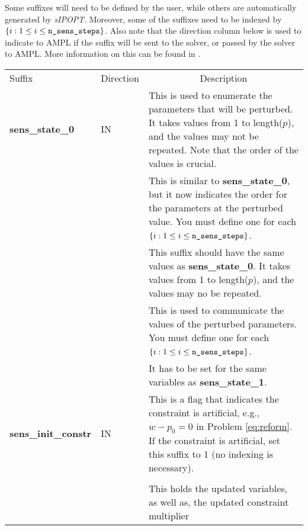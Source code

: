 \documentclass[letter, 11pt]{article}
\newcommand{\sensKKT}{\emph{sIPOPT}}
\newcommand{\AMPL}{AMPL}
\newcommand{\curls}[1]{\ensuremath{\left\{ #1 \right\}}}
\newcommand{\statez}{sens\_state\_0}
\newcommand{\stateo}{sens\_state\_1}
\newcommand{\initc}{sens\_init\_constr}
\newcommand{\statei}[1]{sens\_state\_#1}
\newcommand{\statevi}[1]{sens\_state\_value\_#1}
\newcommand{\sstatei}[1]{sens\_sol\_state\_#1}
\newcommand{\nstepsopt}{n\_sens\_steps}
\begin{document}
Some suffixes will need to be defined by the user, while others are automatically generated by {\sensKKT}. Moreover,
some of the suffixes need to be indexed by  $\curls{i: 1 \leq i \leq \mbox{\texttt{\nstepsopt}}}$. Also note that the
direction column below is used to indicate to {\AMPL} if the suffix will be sent to the solver, or passed by the solver to {\AMPL}.
More information on this can be found in \cite{ampl}.\\

\begin{tabular}{|>{\centering}m{3.5cm}|>{\centering}m{2cm}|m{}|}\hline
\multicolumn{3}{|c|}{\textbf{Defined by User}} \\ \hline
Suffix & Direction & \multicolumn{1}{c|}{Description}  \\ \hline
\textbf{\statez} & IN & This is used to enumerate the parameters that will be perturbed. It takes values from 1 to length($p$), and
                      the values may not be repeated. Note that the order of the values is crucial.\\ \hline
\multirow{2}{*}{\textbf{\statei{\emph{i}}}} & \multirow{2}{*}{IN } &
                         This is similar to \textbf{\statez}, but it now indicates the order for the parameters at the perturbed value.
                         You must define one for each $\curls{i: 1 \leq i \leq \mbox{\texttt{\nstepsopt}}}$. \\
                      && This suffix should have the same values as \textbf{\statez}. It takes values from 1 to length($p$), and
                         the values may no be repeated.\\ \hline
\multirow{2}{*}{\textbf{\statevi{\emph{i}}}} & \multirow{2}{*}{IN} &
                           This is used to communicate the values of the perturbed parameters.
                           You must define one for each  $\curls{i: 1 \leq i \leq \mbox{\texttt{\nstepsopt}}}$. \\
                      &&   It has to be set for the same variables as \textbf{\stateo}.\\ \hline
\textbf{\initc} & IN & This is a flag that indicates the constraint is artificial, e.g., $w - p_0=0$ in Problem \eqref{eq:reform}.
              If the constraint is artificial, set this suffix to 1 (no indexing is necessary). \\ \hline
\multicolumn{3}{|c|}{\textbf{Defined by \sensKKT}} \\ \hline
\multirow{2}{*}{\textbf{\sstatei{\emph{i}}}} & \multirow{2}{*}{OUT} &  This holds the updated variables, as well as, the updated constraint multiplier

\end{tabular}
\end{document}
